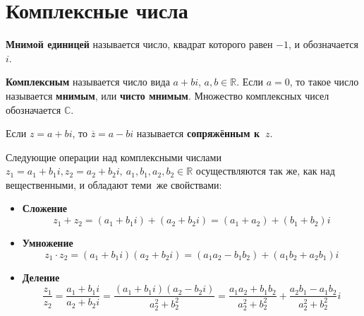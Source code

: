 \section{Комплексные числа}
  \textbf{Мнимой единицей} называется число, квадрат которого равен $-1$, и обозначается $i$.

 \textbf{Комплексным} называется число вида $a + bi$, $a, b \in \mathbb R$.
 Если $a = 0$, то такое число называется \textbf{мнимым}, или \textbf{чисто мнимым}.
 Множество комплексных чисел обозначается $\mathbb C$.

Если $z = a + bi$, то $\overline z = a - bi$ называется \textbf{сопряжённым к~$z$}.

Следующие операции над комплексными числами $z_1 = a_1 + b_1 i, z_2 = a_2 + b_2 i, \ a_1, b_1, a_2, b_2 \in \mathbb R$ осуществляются так же, как над вещественными, и обладают теми~же свойствами:
\begin{itemize}
	\item\textbf{Сложение}
	\begin{equation*}
	z_1 + z_2 = (a_1 + b_1 i) + (a_2 + b_2 i) = (a_1 + a_2) + (b_1 + b_2)i
	\end{equation*}
	
	\item\textbf{Умножение}
	\begin{equation*}
	z_1 \cdot z_2 = (a_1 + b_1 i)(a_2 + b_2 i) = (a_1 a_2 - b_1 b_2) + (a_1 b_2 + a_2 b_1)i
	\end{equation*}
	
	\item\textbf{Деление}
	\begin{equation*}
	\frac{z_1}{z_2} = \frac{a_1 + b_1 i}{a_2 + b_2 i} =
	\frac{(a_1 + b_1 i)(a_2 - b_2 i)}{a_2^2 + b_2^2} =
	\frac{a_1 a_2 + b_1 b_2}{a_2^2 + b_2^2} + \frac{a_2 b_1 - a_1 b_2}{a_2^2 + b_2^2} i
	\end{equation*}
\end{itemize}